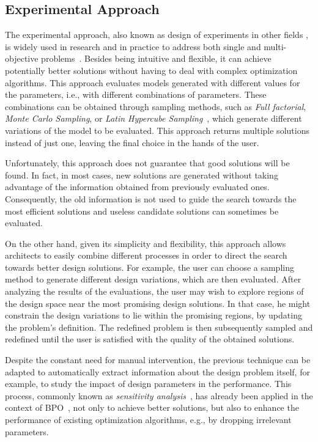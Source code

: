 	\subsection{Experimental Approach}
	\label{ssec:doe}
	
	The experimental approach, also known as design of experiments in other fields \cite{Giunta2003DOE}, is widely used in research and in practice to address both single and multi-objective problems~\cite{Fang2017}. Besides being intuitive and flexible, it can achieve potentially better solutions without having to deal with complex optimization algorithms. This approach evaluates models generated with different values for the parameters, i.e., with different combinations of parameters. These combinations can be obtained through sampling methods, such as \textit{Full factorial}, \textit{Monte Carlo Sampling}, or \textit{Latin Hypercube Sampling}~\cite{Giunta2003DOE}, which generate different variations of the model to be evaluated. This approach returns multiple solutions instead of just one, leaving the final choice in the hands of the user.
	
	Unfortunately, this approach does not guarantee that good solutions will be found. In fact, in most cases, new solutions are generated without taking advantage of the information obtained from previously evaluated ones. Consequently, the old information is not used to guide the search towards the most efficient solutions and useless candidate solutions can sometimes be evaluated. 
	
	On the other hand, given its simplicity and flexibility, this approach allows architects to easily combine different processes in order to direct the search towards better design solutions. For example, the user can choose a sampling method to generate different design variations, which are then evaluated. After analyzing the results of the evaluations, the user may wish to explore regions of the design space near the most promising design solutions. In that case, he might constrain the design variations to lie within the promising regions, by updating the problem’s definition. The redefined problem is then subsequently sampled and redefined until the user is satisfied with the quality of the obtained solutions.
	
	Despite the constant need for manual intervention, the previous technique can be adapted to automatically extract information about the design problem itself, for example, to study the impact of design parameters in the performance. This process, commonly known as \textit{sensitivity analysis}~\cite{Saltelli2007}, has already been applied in the context of \ac{BPO}~\cite{Tian2013}, not only to achieve better solutions, but also to enhance the performance of existing optimization algorithms, e.g., by dropping irrelevant parameters.
	

